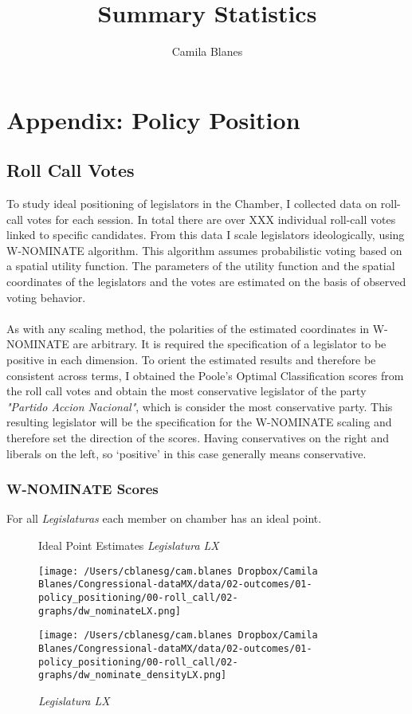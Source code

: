 \documentclass{article}
\title{Summary Statistics}
\author{Camila Blanes}
\date{}
\begin{document}
\section*{Appendix: Policy Position}

\subsection{Roll Call Votes}
To study ideal positioning of legislators in the Chamber, I collected data on roll-call votes for each session. In total there are over XXX individual roll-call votes linked to specific candidates. From this data I scale legislators ideologically, using W-NOMINATE algorithm. This algorithm assumes probabilistic voting based on a spatial utility function. The parameters of the utility function and the spatial coordinates of the legislators and the votes are estimated on the basis of observed voting behavior. \\
\\
As with any scaling method, the polarities of the estimated coordinates in W-NOMINATE are arbitrary. It is required the specification of a legislator to be positive in each dimension. To orient the estimated results and therefore be consistent across terms, I obtained the Poole's Optimal Classification scores from the roll call votes and obtain the most conservative legislator of the party \textit{"Partido Accion Nacional"}, which is consider the most conservative party. This resulting legislator will be the specification for the W-NOMINATE scaling and therefore set the direction of the scores. Having conservatives on the right and liberals on the left, so ‘positive’ in this case generally means conservative. 
\subsubsection*{W-NOMINATE Scores}

For all \textit{Legislaturas} each member on chamber has an ideal point. 

\begin{figure}[!h]
	\centering
	\begin{minipage}{.5\textwidth}
		\centering
	\caption{Ideal Point Estimates \textit{Legislatura LX}}
		\texttt{[image: /Users/cblanesg/cam.blanes Dropbox/Camila Blanes/Congressional-dataMX/data/02-outcomes/01-policy\_positioning/00-roll\_call/02-graphs/dw\_nominateLX.png]}
		\label{fig:test1}
	\end{minipage}%
	\begin{minipage}{.5\textwidth}
		\centering
	\caption{\textit{Legislatura LX}}
		\texttt{[image: /Users/cblanesg/cam.blanes Dropbox/Camila Blanes/Congressional-dataMX/data/02-outcomes/01-policy\_positioning/00-roll\_call/02-graphs/dw\_nominate\_densityLX.png]}
		\label{fig:test2}
	\end{minipage}
\end{figure}
\end{document}
